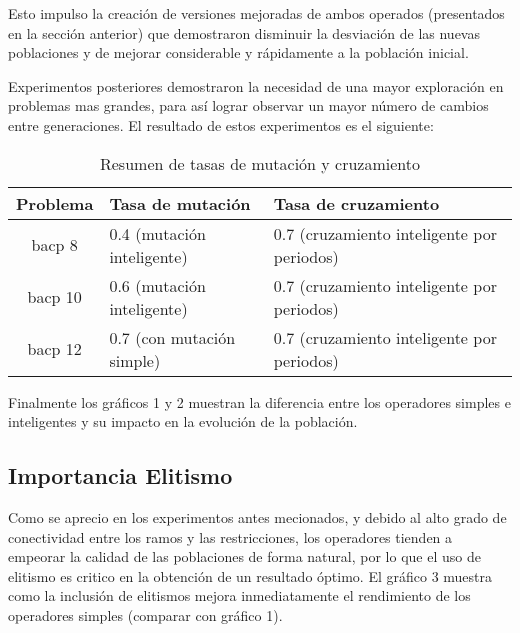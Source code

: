 \documentclass[letter, 10pt]{article}
\begin{document}
Esto impulso la creación de versiones mejoradas de ambos operados (presentados
en la sección anterior) que demostraron disminuir la desviación de las nuevas
poblaciones y de mejorar considerable y rápidamente a la población inicial.

Experimentos posteriores demostraron la necesidad de una mayor exploración en
problemas mas grandes, para así lograr observar un mayor número de cambios entre
generaciones. El resultado de estos experimentos es el siguiente:

\begin{table}[h]
\label{table:tasas}
\caption{Resumen de tasas de mutación y cruzamiento}
\begin{tabular}{|c|l|l|}
\hline 
Problema & Tasa de mutación  & Tasa de cruzamiento \tabularnewline
\hline 
\hline 
bacp 8 & 0.4 (mutación inteligente) & 0.7 (cruzamiento inteligente por periodos) \tabularnewline
\hline 
bacp 10 & 0.6 (mutación inteligente) & 0.7 (cruzamiento inteligente por periodos) \tabularnewline
\hline 
bacp 12 & 0.7 (con mutación simple) & 0.7 (cruzamiento inteligente por periodos) \tabularnewline
\hline 
\end{tabular}
\end{table}

Finalmente los gráficos 1 y 2 muestran la diferencia entre los operadores
simples e inteligentes y su impacto en la evolución de la población.

\begin{center}

\end{center}



\begin{center}

\end{center}


\subsection{Importancia Elitismo}
Como se aprecio en los experimentos antes mecionados, y debido al alto grado de
conectividad entre los ramos y las restricciones, los operadores tienden a
empeorar la calidad de las poblaciones de forma natural, por lo que el uso de
elitismo es critico en la obtención de un resultado óptimo. El gráfico 3 muestra
como la inclusión de elitismos mejora inmediatamente el rendimiento de los
operadores simples (comparar con gráfico 1).


\begin{center}
  
\end{center}
\end{document}
